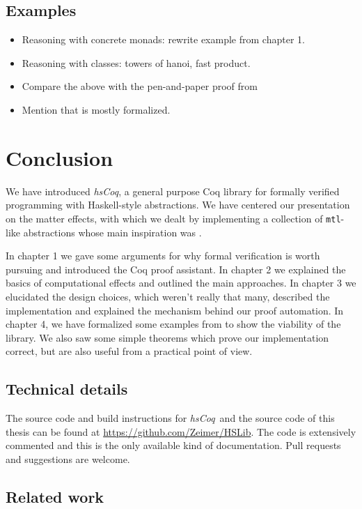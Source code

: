 \documentclass[declaration,inz,english,shortabstract]{iithesis}
\newcommand{\libname}{\textit{hsCoq}}
\newcommand{\homepage}{\url{https://github.com/Zeimer/HSLib}}
\newcommand{\m}[1]{\texttt{#1}}
\begin{document}
\section{Examples}

\begin{itemize}
    \item Reasoning with concrete monads: rewrite example from chapter 1.
    \item Reasoning with classes: towers of hanoi, fast product.
    \item Compare the above with the pen-and-paper proof from \cite{JustDoIt}
    \item Mention that \cite{JustDoIt} is mostly formalized.
\end{itemize}

\chapter{Conclusion}

We have introduced \libname, a general purpose Coq library for formally verified programming with Haskell-style abstractions. We have centered our presentation on the matter effects, with which we dealt by implementing a collection of \m{mtl}-like abstractions whose main inspiration was \cite{JustDoIt}.

In chapter 1 we gave some arguments for why formal verification is worth pursuing and introduced the Coq proof assistant. In chapter 2 we explained the basics of computational effects and outlined the main approaches. In chapter 3 we elucidated the design choices, which weren't really that many, described the implementation and explained the mechanism behind our proof automation. In chapter 4, we have formalized some examples from \cite{JustDoIt} to show the viability of the library. We also saw some simple theorems which prove our implementation correct, but are also useful from a practical point of view.

\section{Technical details}

The source code and build instructions for \libname\ and the source code of this thesis can be found at \homepage. The code is extensively commented and this is the only available kind of documentation. Pull requests and suggestions are welcome.

\section{Related work}
\end{document}
